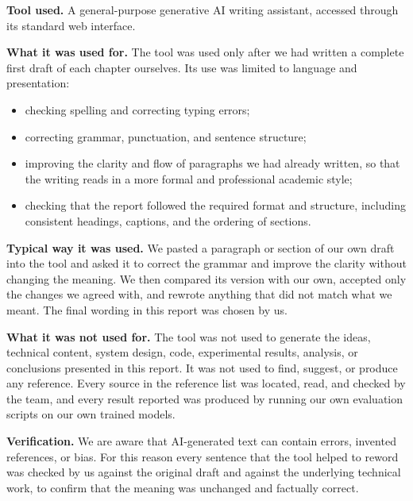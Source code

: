 \textbf{Tool used.} A general-purpose generative AI writing assistant, accessed
through its standard web interface.

\textbf{What it was used for.} The tool was used only after we had written a
complete first draft of each chapter ourselves. Its use was limited to language
and presentation:

\begin{itemize}
  \item checking spelling and correcting typing errors;
  \item correcting grammar, punctuation, and sentence structure;
  \item improving the clarity and flow of paragraphs we had already written, so
        that the writing reads in a more formal and professional academic style;
  \item checking that the report followed the required format and structure,
        including consistent headings, captions, and the ordering of sections.
\end{itemize}

\textbf{Typical way it was used.} We pasted a paragraph or section of our own
draft into the tool and asked it to correct the grammar and improve the clarity
without changing the meaning. We then compared its version with our own,
accepted only the changes we agreed with, and rewrote anything that did not
match what we meant. The final wording in this report was chosen by us.

\textbf{What it was not used for.} The tool was not used to generate the ideas,
technical content, system design, code, experimental results, analysis, or
conclusions presented in this report. It was not used to find, suggest, or
produce any reference. Every source in the reference list was located, read, and
checked by the team, and every result reported was produced by running our own
evaluation scripts on our own trained models.

\textbf{Verification.} We are aware that AI-generated text can contain errors,
invented references, or bias. For this reason every sentence that the tool
helped to reword was checked by us against the original draft and against the
underlying technical work, to confirm that the meaning was unchanged and
factually correct.
